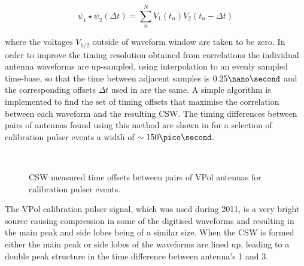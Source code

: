 \begin{equation}
  \psi_{1} \star \psi_{2} (\Delta t) = \sum_{n}^{N} V_{1}(t_{n}) V_{2}(t_{n}-\Delta t)
  \label{eq:analysis:Reconstruction:Discrete-Cross-Correlation}
\end{equation}

\noindent where the voltages $V_{1/2}$ outside of waveform window are taken to be zero. In order to improve the timing resolution obtained from correlations the individual antenna waveforms are up-sampled, using interpolation to an evenly sampled time-base, so that the time between adjacent samples is $0.25 \nano \second$ and the corresponding offsets $\Delta t$ used in  are the same. A simple algorithm is implemented to find the set of timing offsets that maximise the correlation between each waveform and the resulting CSW. The timing differences between pairs of antennas found using this method are shown in  for a selection of calibration pulser events a width of $\sim 150 \pico \second$. 

\begin{figure}[htpb]
  \hfill
  \\
  \hfill
  \caption{CSW measured time offsets between pairs of VPol antennas for calibration pulser events.}
  \label{fig:analysis:Reconstruction:CSW-DeltaT}
\end{figure}


The VPol calibration pulser signal, which was used during 2011, is a very bright source causing compression in some of the digitised waveforms and resulting in the main peak and side lobes being of a similar size. When the CSW is formed either the main peak or side lobes of the waveforms are lined up, leading to a double peak structure in the time difference between antenna's 1 and 3. 

